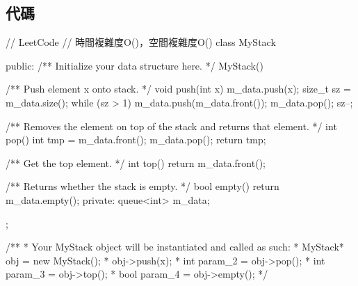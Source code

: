 \subsection{代碼}
\begin{Code}
// LeetCode
// 時間複雜度O()，空間複雜度O()
class MyStack {
public:
    /** Initialize your data structure here. */
    MyStack() {

    }

    /** Push element x onto stack. */
    void push(int x) {
        m_data.push(x);
        size_t sz = m_data.size();
        while (sz > 1)
        {
            m_data.push(m_data.front());
            m_data.pop();
            sz--;
        }
    }

    /** Removes the element on top of the stack and returns that element. */
    int pop() {
        int tmp = m_data.front();
        m_data.pop();
        return tmp;
    }

    /** Get the top element. */
    int top() {
        return m_data.front();
    }

    /** Returns whether the stack is empty. */
    bool empty() {
        return m_data.empty();
    }
private:
    queue<int> m_data;
};

/**
 * Your MyStack object will be instantiated and called as such:
 * MyStack* obj = new MyStack();
 * obj->push(x);
 * int param_2 = obj->pop();
 * int param_3 = obj->top();
 * bool param_4 = obj->empty();
 */
\end{Code}
